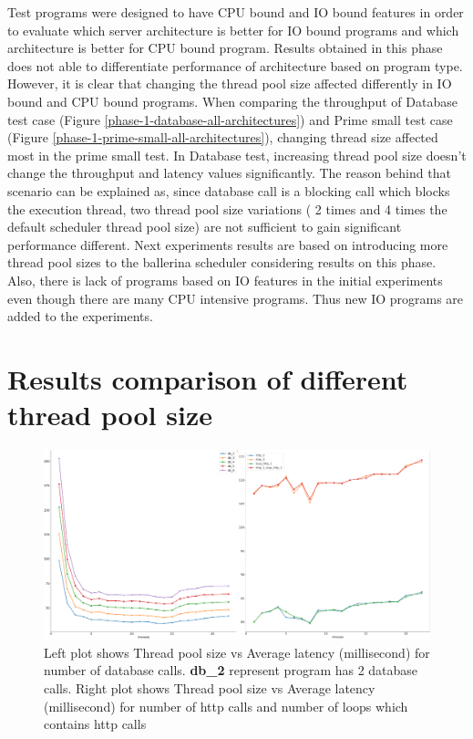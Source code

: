 Test programs were designed to have CPU bound and IO bound features in order to evaluate which server architecture is better for IO bound programs and which architecture is better for CPU bound program. Results obtained in this phase does not able to differentiate performance of architecture based on program type. However, it is clear that changing the thread pool size affected differently in IO bound and CPU bound programs. When comparing the throughput of Database test case (Figure \ref{phase-1-database-all-architectures}) and Prime small test case (Figure \ref{phase-1-prime-small-all-architectures}), changing thread size affected most in the prime small test. In Database test, increasing thread pool size doesn't change the throughput and latency values significantly. The reason behind that scenario can be explained as, since database call is a blocking call which blocks the execution thread, two thread pool size variations ( 2 times and 4 times the default scheduler thread pool size) are not sufficient to gain significant performance different. Next experiments results are based on introducing more thread pool sizes to the ballerina scheduler considering results on this phase. Also, there is lack of programs based on IO features in the initial experiments even though there are many CPU intensive programs. Thus new IO programs are added to the experiments.

\section{Results comparison of different thread pool size}

\begin{figure}[htbp]
	\begin{center}
		\includegraphics[scale=1]{figures/pool-db-http.png}
	\end{center}
	\caption{Left plot shows Thread pool size vs Average latency (millisecond) for number of database calls. \textbf{db\_2} represent program has 2 database calls. Right plot shows Thread pool size vs Average latency (millisecond) for number of http calls and number of loops which contains http calls}
	\label{thread_pool_database_and_http}
\end{figure}

